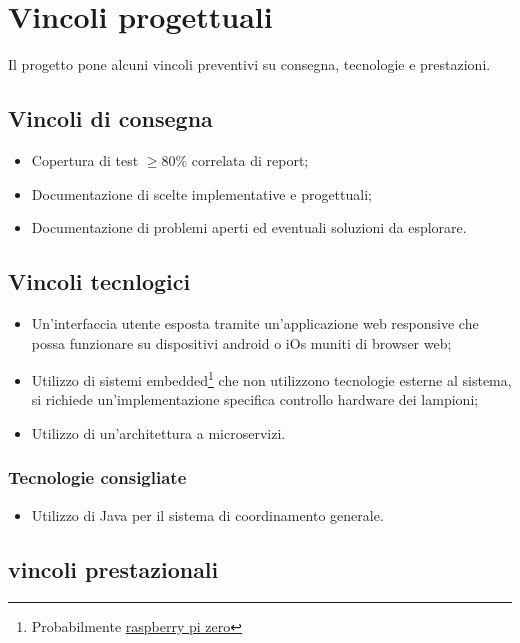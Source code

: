 \section{Vincoli progettuali}

Il progetto pone alcuni vincoli preventivi su consegna, tecnologie e prestazioni.

\subsection{Vincoli di consegna}
\begin{itemize}
    \item Copertura di test $\geq 80\%$ correlata di report;
    \item Documentazione di scelte implementative e progettuali;
    \item Documentazione di problemi aperti ed eventuali soluzioni da esplorare.
\end{itemize}

\subsection{Vincoli tecnlogici}
\begin{itemize}
    \item Un'interfaccia utente esposta tramite un'applicazione web responsive che possa funzionare su dispositivi android o iOs muniti di browser web;
    \item Utilizzo di sistemi embedded\footnote{Probabilmente \href{https://www.raspberrypi.com/products/raspberry-pi-zero-w/}{raspberry pi zero}} che non utilizzono tecnologie esterne al sistema, si richiede un'implementazione specifica controllo hardware dei lampioni;
    \item Utilizzo di un'architettura a microservizi.
\end{itemize}

\subsubsection{Tecnologie consigliate}

\begin{itemize}
    \item Utilizzo di Java per il sistema di coordinamento generale.
\end{itemize}

\subsection{vincoli prestazionali}

